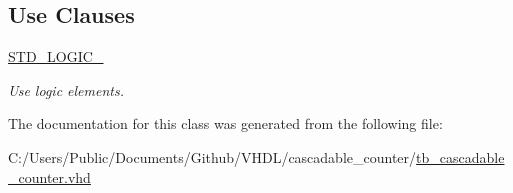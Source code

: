 \subsection*{Use Clauses}
 \begin{DoxyCompactItemize}
\item 
\hyperlink{classtb__cascadable__counter_aa4b2b25246a821511120e3149b003563}{S\+T\+D\+\_\+\+L\+O\+G\+I\+C\+\_}   \hypertarget{classtb__cascadable__counter_aa4b2b25246a821511120e3149b003563}{}\label{classtb__cascadable__counter_aa4b2b25246a821511120e3149b003563}

\begin{DoxyCompactList}\small\item\em Use logic elements. \end{DoxyCompactList}\end{DoxyCompactItemize}


The documentation for this class was generated from the following file\+:\begin{DoxyCompactItemize}
\item 
C\+:/\+Users/\+Public/\+Documents/\+Github/\+V\+H\+D\+L/cascadable\+\_\+counter/\hyperlink{tb__cascadable__counter_8vhd}{tb\+\_\+cascadable\+\_\+counter.\+vhd}\end{DoxyCompactItemize}
